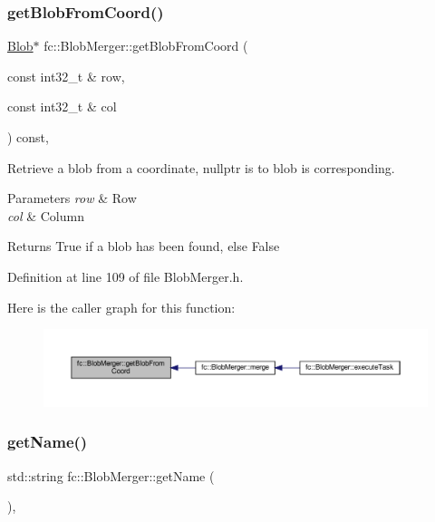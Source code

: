 \subsubsection{\texorpdfstring{get\+Blob\+From\+Coord()}{getBlobFromCoord()}}
{\footnotesize\ttfamily \hyperlink{classfc_1_1Blob}{Blob}$\ast$ fc\+::\+Blob\+Merger\+::get\+Blob\+From\+Coord (\begin{DoxyParamCaption}\item[{const int32\+\_\+t \&}]{row,  }\item[{const int32\+\_\+t \&}]{col }\end{DoxyParamCaption}) const\hspace{0.3cm}{\ttfamily [inline]}, {\ttfamily [private]}}



Retrieve a blob from a coordinate, nullptr is to blob is corresponding. 


\begin{DoxyParams}{Parameters}
{\em row} & Row \\
\hline
{\em col} & Column \\
\hline
\end{DoxyParams}
\begin{DoxyReturn}{Returns}
True if a blob has been found, else False 
\end{DoxyReturn}


Definition at line 109 of file Blob\+Merger.\+h.

Here is the caller graph for this function\+:
\nopagebreak
\begin{figure}[H]
\begin{center}
\leavevmode
\includegraphics[width=350pt]{d3/df4/classfc_1_1BlobMerger_ac2e61560c60b1467e385a3d08577c650_icgraph}
\end{center}
\end{figure}
\mbox{\label{classfc_1_1BlobMerger_a5b14aeeae9e03ceee8fdd90d2828a1bb}} 
\subsubsection{\texorpdfstring{get\+Name()}{getName()}}
{\footnotesize\ttfamily std\+::string fc\+::\+Blob\+Merger\+::get\+Name (\begin{DoxyParamCaption}{ }\end{DoxyParamCaption})\hspace{0.3cm}{\ttfamily [inline]}, {\ttfamily [override]}}



